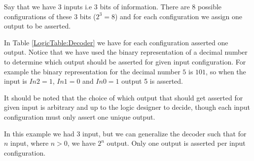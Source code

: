             Say that we have 3 inputs i.e 3 bits of information. There are 8 possible configurations of these 3 bits ($2^{3}=8$) and for each configuration we assign one output to be asserted. 
            
            In Table \ref{LogicTable:Decoder} we have for each configuration asserted one output. Notice that we have used the binary representation of a decimal number to determine which output should be asserted for given input configuration. For example the binary representation for the decimal number $5$ is $101$, so when the input is $In2=1$, $In1=0$ and $In0=1$ output 5 is asserted. 
            
            It should be noted that the choice of which output that should get asserted for given input is arbitrary and up to the logic designer to decide, though each input configuration must only assert one unique output.
            
            In this example we had 3 input, but we can generalize the decoder such that for $n$ input, where $n > 0$,  we have $2^{n}$ output. Only one output is asserted per input configuration. 
            
